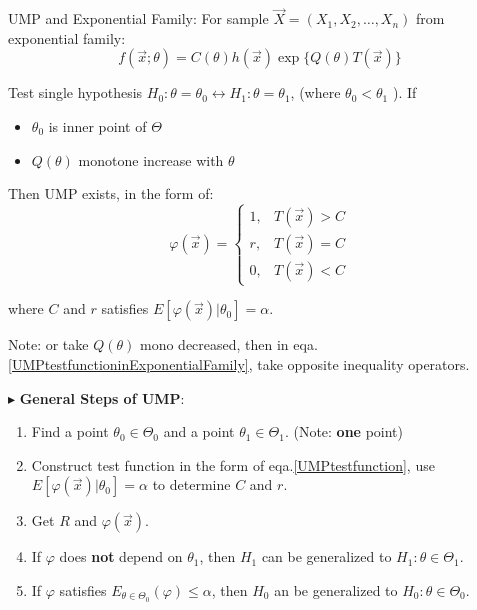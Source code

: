\documentclass[11pt,a4paper]{ctexart}
\numberwithin{equation}{section}%
\newenvironment{point}{\raggedright$\blacktriangleright$}{}%
\begin{document}
    UMP and Exponential Family: For sample $\vec{X}=(X_1,X_2,\dots,X_n)$ from exponential family:
    \[
    f(\vec{x};\theta)=C(\theta)h(\vec{x})\exp\{Q(\theta)T(\vec{x})\}    
    \]

    Test single hypothesis $H_0:\theta=\theta_0\longleftrightarrow H_1:\theta=\theta_1$, (where $ \theta_0<\theta_1 $ ).
    If 
    \begin{itemize}[topsep=0.5pt,itemsep=0pt]
        \item $\theta_0$ is inner point of $\Theta$
        \item $Q(\theta)$  monotone increase with $\theta$
    \end{itemize}

    Then UMP exists, in the form of:
    \begin{equation}\label{UMPtestfunctioninExponentialFamily}
            \varphi(\vec{x})=\begin{cases}
        1,&T(\vec{x})>C\\
        r,&T(\vec{x})=C\\
        0,&T(\vec{x})<C
    \end{cases} 
    \end{equation}
   
    

    where $C$ and $r$ satisfies $E[\varphi(\vec{x})|\theta_0]=\alpha$.

    Note: or take $Q(\theta)$ mono decreased, then in eqa.\ref{UMPtestfunctioninExponentialFamily}, take opposite inequality operators.
    
\begin{point}
    \textbf{General Steps of UMP}:
\end{point}

    
    \begin{enumerate}
        \item Find a point $\theta_0\in\Theta_0$ and a point $\theta_1\in\Theta_1$. (Note: \textbf{one} point)
        \item Construct test function in the form of eqa.\hyperref[UMPtestfunction]{\ref{UMPtestfunction}}, use $E[\varphi(\vec{x})|\theta_0]=\alpha$ to determine $C$ and $r$.
        \item Get $R$ and $\varphi(\vec{x})$.
        \item If $\varphi$ does \textbf{not} depend on $\theta_1$, then $H_1$ can be generalized to $H_1:\theta\in\Theta_1$.
        \item If $\varphi$ satisfies $E_{\theta\in\Theta_0}(\varphi)\leq\alpha$, then $H_0$ an be generalized to $H_0:\theta\in\Theta_0$.
    \end{enumerate}
\end{document}
